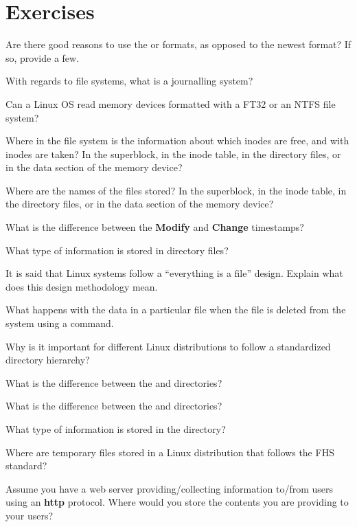 
\section*{Exercises}

\begin{exercises}
  \item Are there good reasons to use the  or  formats, as opposed to the newest  format? If so, provide a few.
  \item With regards to file systems, what is a journalling system?
  \item Can a Linux \acs{OS} read memory devices formatted with a FT32 or an NTFS file system?
  \item Where in the file system is the information about which inodes are free, and with inodes are taken? In the superblock, in the inode table, in the directory files, or in the data section of the memory device?
  \item Where are the names of the files stored? In the superblock, in the inode table, in the directory files, or in the data section of the memory device?
  \item What is the difference between the \textbf{Modify} and \textbf{Change} timestamps?
  \item What type of information is stored in directory files?
  \item It is said that Linux systems follow a ``everything is a file'' design. Explain what does this design methodology mean.
  \item What happens with the data in a particular file when the file is deleted from the system using a  command.
  \item Why is it important for different Linux distributions to follow a standardized directory hierarchy?
  \item What is the difference between the  and  directories?
  \item What is the difference between the  and  directories?
  \item What type of information is stored in the  directory?
  \item Where are temporary files stored in a Linux distribution that follows the \acs{FHS} standard?
  \item Assume you have a web server providing/collecting information to/from users using an \textbf{http} protocol. Where would you store the contents you are providing to your users?
\end{exercises}
